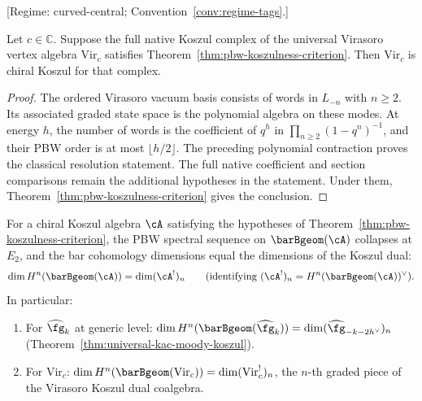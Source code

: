 \begin{theorem}
\label{thm:virasoro-chiral-koszul}
\textup{[Regime: curved-central\textup{;}
Convention~\textup{\ref{conv:regime-tags}}.]}

Let $c\in\mathbb C$.
Suppose the full native Koszul complex of the universal Virasoro vertex algebra $\mathrm{Vir}_c$ satisfies Theorem~\ref{thm:pbw-koszulness-criterion}.
Then $\mathrm{Vir}_c$ is chiral Koszul for that complex.
\end{theorem}
\begin{proof}
The ordered Virasoro vacuum basis consists of words in $L_{-n}$ with $n\ge2$.
Its associated graded state space is the polynomial algebra on these modes.
At energy $h$, the number of words is the coefficient of $q^h$ in $\prod_{n\ge2}(1-q^n)^{-1}$, and their PBW order is at most $\lfloor h/2\rfloor$.
The preceding polynomial contraction proves the classical resolution statement.
The full native coefficient and section comparisons remain the additional hypotheses in the statement.
Under them, Theorem~\ref{thm:pbw-koszulness-criterion} gives the conclusion.
\end{proof}

\begin{corollary}
\label{cor:bar-cohomology-koszul-dual}
For a chiral Koszul algebra $\cA$ satisfying the hypotheses of
Theorem~\textup{\ref{thm:pbw-koszulness-criterion}},
the PBW spectral sequence on $\barBgeom(\cA)$ collapses
at $E_2$, and the bar cohomology dimensions equal the
dimensions of the Koszul dual:
\[
\dim H^n(\barBgeom(\cA)) = \dim (\cA^!)_n
\qquad\textup{(identifying $(\cA^!)_n = H^n(\barBgeom(\cA))^\vee$)}.
\]
In particular:
\begin{enumerate}
\item For $\widehat{\fg}_k$ at generic level:
  $\dim H^n(\barBgeom(\widehat{\fg}_k)) = \dim (\widehat{\fg}_{-k-2h^\vee})_n$
  \textup{(}Theorem~\textup{\ref{thm:universal-kac-moody-koszul})}.
\item For $\mathrm{Vir}_c$:
  $\dim H^n(\barBgeom(\mathrm{Vir}_c)) = \dim (\mathrm{Vir}_c^!)_n$,
  the $n$-th graded piece of the Virasoro Koszul dual coalgebra.
\end{enumerate}
\end{corollary}

